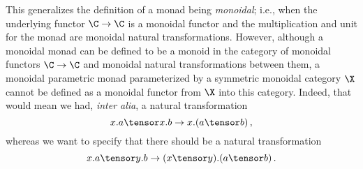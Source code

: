 \begin{remark}
  This generalizes the definition of a monad being \emph{monoidal}; i.e., when the underlying functor $\C \to \C$ is a monoidal functor and the multiplication and unit for the monad are monoidal natural transformations.  
  However, although a monoidal monad can be defined to be a monoid in the category of monoidal functors $\C \to \C$ and monoidal natural transformations between them, a monoidal parametric monad parameterized by a symmetric monoidal category $\X$ cannot be defined as a monoidal functor from $\X$ into this category.  
  Indeed, that would mean we had, \emph{inter alia}, a natural transformation
  \[
    x.a \tensor x.b \to x.(a\tensor b)\,,
    \]
  whereas we want to specify that there should be a natural transformation
  \[
    x.a \tensor y.b \to (x\tensor y).(a\tensor b)\,.
    \]
\end{remark}

